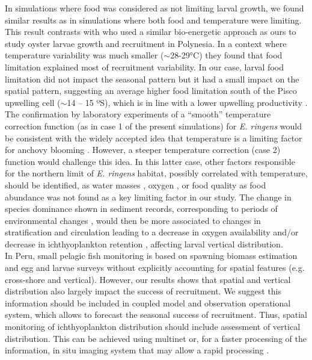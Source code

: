 In simulations where food was considered as not limiting larval growth, we found similar results as in simulations where both food and temperature were limiting. This result contrasts with \cite{ThomDuma2016} who used a similar bio-energetic approach as ours to study oyster larvae growth and recruitment in Polynesia. In a context where temperature variability was much smaller ($\sim$28-29°C) they found that food limitation explained most of recruitment variability. In our case, larval food limitation did not impact the seasonal pattern but it had a small impact on the spatial pattern, suggesting an average higher food limitation south of the Pisco upwelling cell ($\sim$14 – 15 ºS), which is in line with a lower upwelling productivity \citep{EspiEche2017}.\\

The confirmation by laboratory experiments of a ``smooth” temperature correction function (as in case 1 of the present simulations) for \textit{E. ringens} would be consistent with the widely accepted idea that temperature is a limiting factor for anchovy blooming \citep{ChavBert2008}. However, a steeper temperature correction (case 2) function would challenge this idea. In this latter case, other factors responsible for the northern limit of \textit{E. ringens} habitat, possibly correlated with temperature, should be identified, as water masses \citep{BertSegu2004,SwarBert2008}, oxygen \citep{BertChai2011}, or food quality \citep{AyonSwar2008,CaldAyor2020} as food abundance was not found as a key limiting factor in our study. The change in species dominance shown in sediment records, corresponding to periods of environmental changes \citep{Salv2018,Salv2019}, would then be more associated to changes in stratification and circulation leading to a decrease in oxygen availability and/or decrease in ichthyoplankton retention \citep{BrocEche2013,EspiEche2021}, affecting larval vertical distribution.\\

In Peru, small pelagic fish monitoring is based on spawning biomass estimation and egg and larvae surveys \citep{PaulSori1987,Ayon2000,GutiCast2012} without explicitly accounting for spatial features (e.g. cross-shore and vertical). However, our results shows that spatial and vertical distribution also largely impact the success of recruitment. We suggest this information should be included in coupled model and observation operational system, which allows to forecast the seasonal success of recruitment. Thus, spatial monitoring of ichthyoplankton distribution should include assessment of vertical distribution. This can be achieved using multinet or, for a faster processing of the information, in situ imaging system that may allow a rapid processing \citep{OrenRate2020}.

